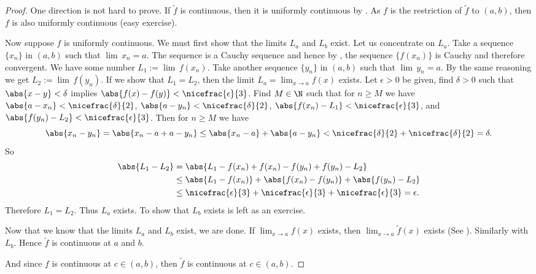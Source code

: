 \documentclass[12pt]{book}
\begin{document}
\begin{proof}
One direction is not hard to prove.
If $\widetilde{f}$ is continuous, then
it is uniformly continuous by .
As $f$ is the
restriction of $\widetilde{f}$ to $(a,b)$, then $f$ is also uniformly continuous
(easy exercise).

Now suppose $f$ is uniformly continuous.
We must first show
that the limits $L_a$ and $L_b$ exist.
Let us concentrate on $L_a$.
Take a sequence $\{ x_n \}$ in $(a,b)$ such that $\lim\, x_n = a$.
The sequence is a Cauchy sequence and hence by
,
the sequence $\{ f(x_n) \}$ is Cauchy and therefore convergent.
We have some number $L_1 := \lim\, f(x_n)$.
Take another sequence
$\{ y_n \}$ in $(a,b)$ such that $\lim\, y_n = a$.
By the same reasoning
we get $L_2 := \lim\, f(y_n)$.
If we show that $L_1 = L_2$, then
the limit $L_a = \lim_{x\to a} f(x)$ exists.
Let $\epsilon > 0$ be given,
find $\delta > 0$ such that $\abs{x-y} < \delta$ implies $\abs{f(x)-f(y)} <
\nicefrac{\epsilon}{3}$.
Find $M \in \N$ such that for
$n \geq M$ we have $\abs{a-x_n} < \nicefrac{\delta}{2}$,
$\abs{a-y_n} < \nicefrac{\delta}{2}$,
$\abs{f(x_n)-L_1} < \nicefrac{\epsilon}{3}$, and
$\abs{f(y_n)-L_2} < \nicefrac{\epsilon}{3}$.
Then for $n \geq M$ we have
\begin{equation*}
\abs{x_n-y_n} = 
\abs{x_n-a+a-y_n} \leq
\abs{x_n-a}+\abs{a-y_n} < \nicefrac{\delta}{2} + \nicefrac{\delta}{2} =
\delta.
\end{equation*}
So
\begin{equation*}
\begin{split}
\abs{L_1-L_2} &=
\abs{L_1-f(x_n)+f(x_n)-f(y_n)+f(y_n)-L_2} \\
& \leq 
\abs{L_1-f(x_n)}+\abs{f(x_n)-f(y_n)}+\abs{f(y_n)-L_2} \\
& \leq
\nicefrac{\epsilon}{3} + \nicefrac{\epsilon}{3} + \nicefrac{\epsilon}{3}
=
\epsilon .
\end{split}
\end{equation*}
Therefore $L_1 = L_2$.
Thus $L_a$ exists.
To show that $L_b$ exists is left as an exercise.

Now that we know that the
limits $L_a$ and $L_b$ exist, we are done.
If $\lim_{x\to a} f(x)$
exists, then $\lim_{x\to a} \widetilde{f}(x)$ exists
(See ).
Similarly with $L_b$.
Hence $\widetilde{f}$ is continuous at $a$ and $b$.

And since $f$ is continuous at $c \in (a,b)$, then
$\widetilde{f}$ is continuous at $c \in (a,b)$.
\end{proof}
\end{document}
